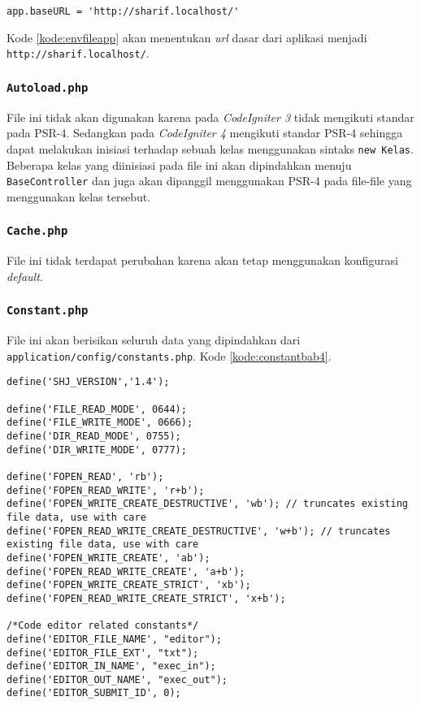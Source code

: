 \begin{lstlisting}[caption= Kode \texttt{application/config/config.php} yang dipindahkan menuju \texttt{.env}, label=kode:envfileapp]
	app.baseURL = 'http://sharif.localhost/'
\end{lstlisting}

Kode \ref{kode:envfileapp} akan menentukan \textit{url} dasar dari aplikasi menjadi \texttt{http://sharif.localhost/}.

\subsubsection{\texttt{Autoload.php}}
File ini tidak akan digunakan karena pada \textit{CodeIgniter 3} tidak mengikuti standar pada PSR-4. Sedangkan pada \textit{CodeIgniter 4} mengikuti standar PSR-4 sehingga dapat melakukan inisiasi terhadap sebuah kelas menggunakan sintaks \texttt{new Kelas}. Beberapa kelas yang diinisiasi pada file ini akan dipindahkan menuju \texttt{BaseController} dan juga akan dipanggil menggunakan PSR-4 pada file-file yang menggunakan kelas tersebut.

\subsubsection{\texttt{Cache.php}}
File ini tidak terdapat perubahan karena akan tetap menggunakan konfigurasi \textit{default}.

\subsubsection{\texttt{Constant.php}}
File ini akan berisikan seluruh data yang dipindahkan dari \texttt{application/config/constants.php}. Kode  \ref{kode:constantbab4}.

\begin{lstlisting}[caption=Pemindahan kode pada \textit{Constant}, label=kode:constantbab4]
define('SHJ_VERSION','1.4');

define('FILE_READ_MODE', 0644);
define('FILE_WRITE_MODE', 0666);
define('DIR_READ_MODE', 0755);
define('DIR_WRITE_MODE', 0777);

define('FOPEN_READ', 'rb');
define('FOPEN_READ_WRITE', 'r+b');
define('FOPEN_WRITE_CREATE_DESTRUCTIVE', 'wb'); // truncates existing file data, use with care
define('FOPEN_READ_WRITE_CREATE_DESTRUCTIVE', 'w+b'); // truncates existing file data, use with care
define('FOPEN_WRITE_CREATE', 'ab');
define('FOPEN_READ_WRITE_CREATE', 'a+b');
define('FOPEN_WRITE_CREATE_STRICT', 'xb');
define('FOPEN_READ_WRITE_CREATE_STRICT', 'x+b');

/*Code editor related constants*/
define('EDITOR_FILE_NAME', "editor");
define('EDITOR_FILE_EXT', "txt");
define('EDITOR_IN_NAME', "exec_in");
define('EDITOR_OUT_NAME', "exec_out");
define('EDITOR_SUBMIT_ID', 0);
\end{lstlisting}

